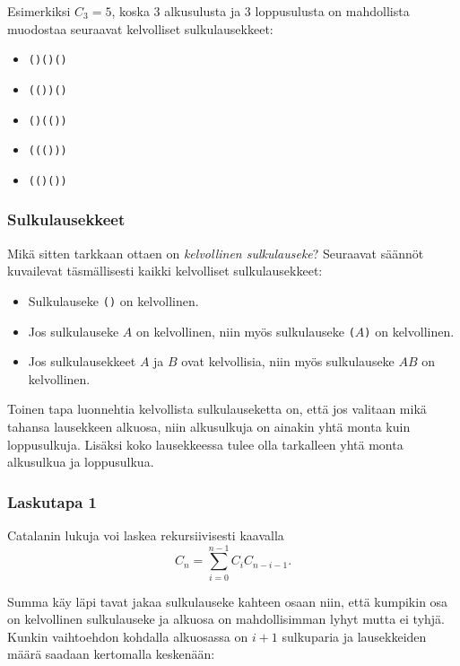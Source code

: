 Esimerkiksi $C_3=5$, koska 3 alkusulusta
ja 3 loppusulusta on mahdollista muodostaa
seuraavat kelvolliset sulkulausekkeet:

\begin{itemize}[noitemsep]
\item \texttt{()()()}
\item \texttt{(())()}
\item \texttt{()(())}
\item \texttt{((()))}
\item \texttt{(()())}
\end{itemize}

\subsubsection{Sulkulausekkeet}


Mikä sitten tarkkaan ottaen on
\textit{kelvollinen sulkulauseke}?
Seuraavat säännöt kuvailevat täsmällisesti
kaikki kelvolliset sulkulausekkeet:

\begin{itemize}
\item Sulkulauseke \texttt{()} on kelvollinen.
\item Jos sulkulauseke $A$ on kelvollinen,
niin myös sulkulauseke \texttt{(}$A$\texttt{)}
on kelvollinen.
\item Jos sulkulausekkeet $A$ ja $B$ ovat kelvollisia,
niin myös sulkulauseke $AB$ on kelvollinen.
\end{itemize}

Toinen tapa luonnehtia kelvollista sulkulauseketta on,
että jos valitaan mikä tahansa lausekkeen alkuosa,
niin alkusulkuja on ainakin yhtä monta
kuin loppusulkuja.
Lisäksi koko lausekkeessa
tulee olla tarkalleen yhtä monta
alkusulkua ja loppusulkua.

\subsubsection{Laskutapa 1}

Catalanin lukuja voi laskea rekursiivisesti kaavalla
\[ C_n = \sum_{i=0}^{n-1} C_{i} C_{n-i-1}.\]

Summa käy läpi tavat
jakaa sulkulauseke kahteen osaan niin,
että kumpikin osa on kelvollinen sulkulauseke
ja alkuosa on mahdollisimman lyhyt mutta ei tyhjä.
Kunkin vaihtoehdon kohdalla alkuosassa
on $i+1$ sulkuparia ja lausekkeiden määrä
saadaan kertomalla keskenään:

